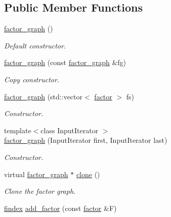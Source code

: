 \subsection*{Public Member Functions}
\begin{DoxyCompactItemize}
\item 
\hyperlink{classmerlin_1_1factor__graph_a6a662ba842145071605d68e998e45a98}{factor\+\_\+graph} ()\hypertarget{classmerlin_1_1factor__graph_a6a662ba842145071605d68e998e45a98}{}\label{classmerlin_1_1factor__graph_a6a662ba842145071605d68e998e45a98}

\begin{DoxyCompactList}\small\item\em Default constructor. \end{DoxyCompactList}\item 
\hyperlink{classmerlin_1_1factor__graph_ad7a6caf6041a1911e3afa977c4c9f06c}{factor\+\_\+graph} (const \hyperlink{classmerlin_1_1factor__graph}{factor\+\_\+graph} \&fg)
\begin{DoxyCompactList}\small\item\em Copy constructor. \end{DoxyCompactList}\item 
\hyperlink{classmerlin_1_1factor__graph_a6e9a2dd59408c358b2fac0b0d3838c0e}{factor\+\_\+graph} (std\+::vector$<$ \hyperlink{classmerlin_1_1factor}{factor} $>$ fs)
\begin{DoxyCompactList}\small\item\em Constructor. \end{DoxyCompactList}\item 
{\footnotesize template$<$class Input\+Iterator $>$ }\\\hyperlink{classmerlin_1_1factor__graph_a9f5604018fec35a52f098203833f7618}{factor\+\_\+graph} (Input\+Iterator first, Input\+Iterator last)
\begin{DoxyCompactList}\small\item\em Constructor. \end{DoxyCompactList}\item 
virtual \hyperlink{classmerlin_1_1factor__graph}{factor\+\_\+graph} $\ast$ \hyperlink{classmerlin_1_1factor__graph_a485d9039df843d2db668782ac9c90c8a}{clone} ()
\begin{DoxyCompactList}\small\item\em Clone the factor graph. \end{DoxyCompactList}\item 
\hyperlink{classmerlin_1_1factor__graph_a533556bd4ec6961b63a91a80a8a37508}{findex} \hyperlink{classmerlin_1_1factor__graph_a5899fc5d235ad8681c1437e2845f798d}{add\+\_\+factor} (const \hyperlink{classmerlin_1_1factor}{factor} \&F)

\end{DoxyCompactItemize}
